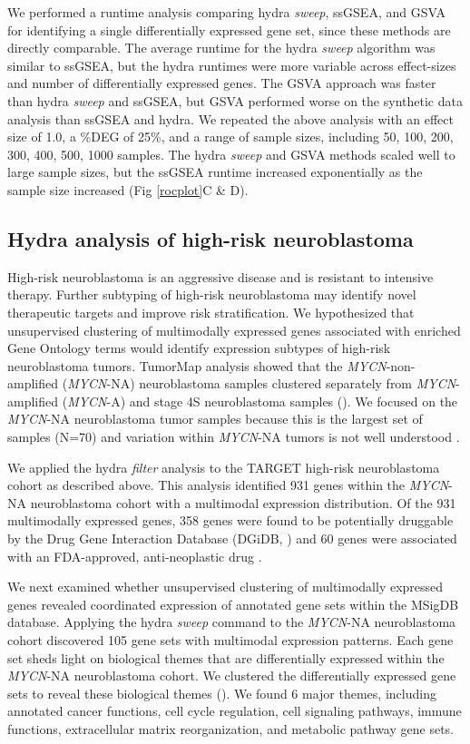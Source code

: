 \documentclass[10pt,letterpaper]{article}
\begin{document}
We performed a runtime analysis comparing hydra \textit{sweep}, ssGSEA, and GSVA for identifying a single differentially expressed gene set, since these methods are directly comparable. The average runtime for the hydra \textit{sweep} algorithm was similar to ssGSEA, but the hydra runtimes were more variable across effect-sizes and number of differentially expressed genes. The GSVA approach was faster than hydra \textit{sweep} and ssGSEA, but GSVA performed worse on the synthetic data analysis than ssGSEA and hydra. We repeated the above analysis with an effect size of 1.0, a \%DEG of 25\%, and a range of sample sizes, including  50, 100, 200, 300, 400, 500, 1000 samples. The hydra \textit{sweep} and GSVA methods scaled well to large sample sizes, but the ssGSEA runtime increased exponentially as the sample size increased (Fig \ref{rocplot}C \& D).

\subsection*{Hydra analysis of high-risk neuroblastoma}
High-risk neuroblastoma is an aggressive disease and is resistant to intensive therapy. Further subtyping of high-risk neuroblastoma may identify novel therapeutic targets and improve risk stratification. We hypothesized that unsupervised clustering of multimodally expressed genes associated with enriched Gene Ontology terms would identify expression subtypes of high-risk neuroblastoma tumors. TumorMap  analysis \cite{newtonTumorMapExploringMolecular2017} showed that the \textit{MYCN}-non-amplified (\textit{MYCN}-NA) neuroblastoma samples clustered separately from \textit{MYCN}-amplified (\textit{MYCN}-A) and stage 4S neuroblastoma samples (). We focused on the \textit{MYCN}-NA neuroblastoma tumor samples because this is the largest set of samples (N=70) and variation within \textit{MYCN}-NA tumors is not well understood \cite{morgensternChallengeDefiningUltrahighrisk2019}.

We applied the hydra \textit{filter} analysis to the TARGET high-risk neuroblastoma cohort as described above. This analysis identified 931 genes within the \textit{MYCN}-NA neuroblastoma cohort with a multimodal expression distribution. Of the 931 multimodally expressed genes, 358 genes were found to be potentially druggable by the Drug Gene Interaction Database (DGiDB, ) and 60 genes were associated with an FDA-approved, anti-neoplastic drug \cite{cotto2017dgidb}.

We next examined whether unsupervised clustering of multimodally expressed genes revealed coordinated expression of annotated gene sets within the MSigDB database. Applying the hydra \textit{sweep} command to the \textit{MYCN}-NA neuroblastoma cohort discovered 105 gene sets with multimodal expression patterns. Each gene set sheds light on biological themes that are differentially expressed within the \textit{MYCN}-NA neuroblastoma cohort. We clustered the differentially expressed gene sets to reveal these biological themes (). We found 6 major themes, including annotated cancer functions, cell cycle regulation, cell signaling pathways, immune functions, extracellular matrix reorganization, and metabolic pathway gene sets.
\end{document}
